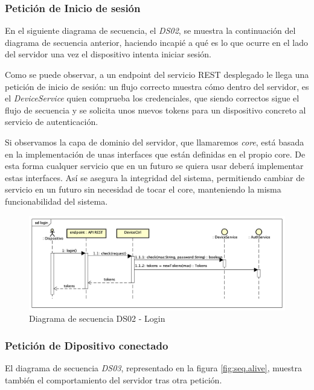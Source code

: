 \subsubsection{Petición de Inicio de sesión}

En el siguiente diagrama de secuencia, el \textit{DS02}, se muestra la continuación del diagrama de secuencia anterior, haciendo incapié a qué es lo que ocurre en el lado del servidor una vez el dispositivo intenta iniciar sesión.

Como se puede observar, a un endpoint del servicio REST desplegado le llega una petición de inicio de sesión: un flujo correcto muestra cómo dentro del servidor, es el \textit{DeviceService} quien comprueba los credenciales, que siendo correctos sigue el flujo de secuencia y se solicita unos nuevos tokens para un dispositivo concreto al servicio de autenticación.

Si observamos la capa de dominio del servidor, que llamaremos \textit{core}, está basada en la implementación de unas interfaces que están definidas en el propio core. De esta forma cualquer servicio que en un futuro se quiera usar deberá implementar estas interfaces. Así se asegura la integridad del sistema, permitiendo cambiar de servicio en un futuro sin necesidad de tocar el core, manteniendo la misma funcionabilidad del sistema.

\begin{figure}[H]
    \centering
    \includegraphics[width=14cm]{./img/sequence/diagram/login.png}
    \caption{Diagrama de secuencia DS02 - Login}
    \label{fig:seq.login}
\end{figure}

\subsubsection{Petición de Dipositivo conectado}

El diagrama de secuencia \textit{DS03}, representado en la figura \ref{fig:seq.alive}, muestra también el comportamiento del servidor tras otra petición.

